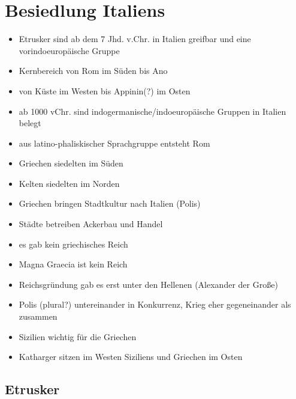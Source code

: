 \documentclass[10pt,a4paper,oneside,ngerman,numbers=noenddot]{scrartcl}
\newenvironment{myitemize}{\begin{itemize}\itemsep -9pt}{\end{itemize}} %
\begin{document}
\section*{Besiedlung Italiens}

\begin{myitemize}
    \item Etrusker sind ab dem 7 Jhd. v.Chr. in Italien greifbar und eine vorindoeuropäische Gruppe
    \item Kernbereich von Rom im Süden bis Ano
    \item von Küste im Westen bis Appinin(?) im Osten
    \item ab 1000 vChr. sind indogermanische/indoeuropäische Gruppen in Italien belegt
    \item aus latino-phaliskischer Sprachgruppe entsteht Rom
    \item Griechen siedelten im Süden
    \item Kelten siedelten im Norden
    \item Griechen bringen Stadtkultur nach Italien (Polis)
    \item Städte betreiben Ackerbau und Handel
    \item es gab kein griechisches Reich
    \item Magna Graecia ist kein Reich
    \item Reichsgründung gab es erst unter den Hellenen (Alexander der Große)
    \item Polis (plural?) untereinander in Konkurrenz, Krieg eher gegeneinander als zusammen
    \item Sizilien wichtig für die Griechen
    \item Katharger sitzen im Westen Siziliens und Griechen im Osten
\end{myitemize}

\subsection*{Etrusker}
\end{document}
